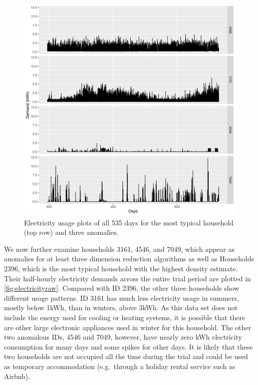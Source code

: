 \documentclass[12pt]{article}
\begin{document}
\begin{figure}

{\centering \includegraphics[width=0.95\linewidth]{figures/Electricity_2d_compare4id_1typical_3anomalous} 

}

\caption{Electricity usage plots of all 535 days for the most typical household (top row) and three anomalies.}\label{fig:electricityraw}
\end{figure}

We now further examine households 3161, 4546, and 7049, which appear as anomalies for at least three dimension reduction algorithms as well as Households 2396, which is the most typical household with the highest density estimate. Their half-hourly electricity demands across the entire trial period are plotted in \autoref{fig:electricityraw}. Compared with ID 2396, the other three households show different usage patterns. ID 3161 has much less electricity usage in summers, mostly below 1kWh, than in winters, above 3kWh. As this data set does not include the energy used for cooling or heating systems, it is possible that there are other large electronic appliances used in winter for this household. The other two anomalous IDs, 4546 and 7049, however, have nearly zero kWh electricity consumption for many days and some spikes for other days. It is likely that these two households are not occupied all the time during the trial and could be used as temporary accommodation (e.g.~through a holiday rental service such as Airbnb).
\end{document}
